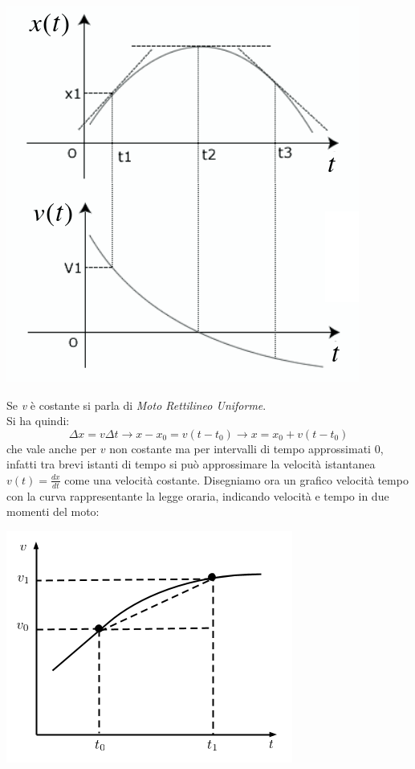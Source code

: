\documentclass[a4paper,12pt, oneside]{book}
\begin{document}
\begin{center}
	\includegraphics[scale=0.36]{img/ist.png}
\end{center}
Se \textit{v} è costante si parla di \textit{Moto Rettilineo Uniforme}. \\
Si ha quindi:
$$\Delta x = v\Delta t\to x-x_0=v(t-t_0)\to x=x_0+v(t-t_0)$$
che vale anche per $v$ non costante ma per intervalli di tempo approssimati 0, infatti tra brevi istanti di tempo si può approssimare la velocità istantanea $v(t)=\frac{dx}{dt}$ come una velocità costante. Disegniamo ora un grafico velocità tempo con la curva rappresentante la legge oraria, indicando velocità e tempo in due momenti del moto:
\begin{center}
	\includegraphics[scale=0.5]{img/gra.png}
\end{center}
\end{document}
